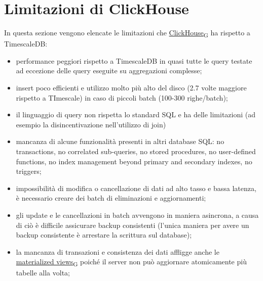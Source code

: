 \section{Limitazioni di ClickHouse}
In questa sezione vengono elencate le limitazioni che \href{https://7last.github.io/docs/pb/documentazione-interna/glossario\#clickhouse}{ClickHouse\textsubscript{G}} ha rispetto a TimescaleDB: 
\begin{itemize}
	\item performance peggiori rispetto a TimescaleDB in quasi tutte le query testate ad eccezione delle query eseguite su aggregazioni complesse;
	\item insert poco efficienti e utilizzo molto più alto del disco (2.7 volte maggiore rispetto a TImescale) in caso di  piccoli batch (100-300 righe/batch);
	\item il linguaggio di query non rispetta lo standard SQL e ha delle limitazioni (ad esempio la disincentivazione nell’utilizzo di join)
	\item mancanza di alcune funzionalità presenti in altri database SQL: no transactions, no correlated sub-queries, no stored procedures, no user-defined functions, no index management beyond primary and secondary indexes, no triggers; 
	\item impossibilità di modifica o cancellazione di dati ad alto tasso e bassa latenza, è necessario creare dei batch di eliminazioni e aggiornamenti;
	\item gli update e le cancellazioni in batch avvengono in maniera asincrona, a causa di ciò è difficile assicurare backup consistenti (l’unica maniera per avere un backup consistente è arrestare la scrittura sul database);
	\item la mancanza di transazioni e consistenza dei dati affligge anche le \href{https://7last.github.io/docs/pb/documentazione-interna/glossario\#materialized-view}{materialized views\textsubscript{G}} poiché il server non può aggiornare atomicamente più tabelle alla volta;
\end{itemize}















